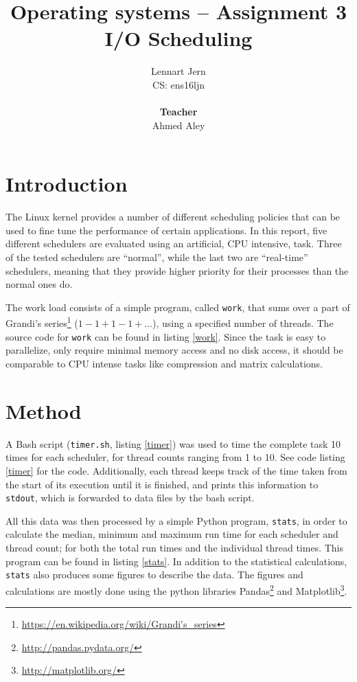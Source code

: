 \documentclass[12pt, a4paper]{article} %
\title{Operating systems -- Assignment 3\\I/O Scheduling}
\author{Lennart Jern\\
	CS: ens16ljn\\ \\ \textbf{Teacher}\\ Ahmed Aley}
\begin{document}
\maketitle

\newpage


\section{Introduction}

The Linux kernel provides a number of different scheduling policies that can be used to fine tune the performance of certain applications.
In this report, five different schedulers are evaluated using an artificial, CPU intensive, task.
Three of the tested schedulers are ``normal'', while the last two are ``real-time'' schedulers, meaning that they provide higher priority for their processes than the normal ones do.

The work load consists of a simple program, called \texttt{work}, that sums over a part of Grandi's series\footnote{\url{https://en.wikipedia.org/wiki/Grandi's_series}} ($1-1+1-1+\dots$), using a specified number of threads.
The source code for \texttt{work} can be found in listing \ref{work}.
Since the task is easy to parallelize, only require minimal memory access and no disk access, it should be comparable to CPU intense tasks like compression and matrix calculations.

\section{Method}

A Bash script (\texttt{timer.sh}, listing \ref{timer}) was used to time the complete task 10 times for each scheduler, for thread counts ranging from 1 to 10.
See code listing \ref{timer} for the code.
Additionally, each thread keeps track of the time taken from the start of its execution until it is finished, and prints this information to \texttt{stdout}, which is forwarded to data files by the bash script.

All this data was then processed by a simple Python program, \texttt{stats}, in order to calculate the median, minimum and maximum run time for each scheduler and thread count; for both the total run times and the individual thread times.
This program can be found in listing \ref{stats}.
In addition to the statistical calculations, \texttt{stats} also produces some figures to describe the data.
The figures and calculations are mostly done using the python libraries Pandas\footnote{\url{http://pandas.pydata.org/}} and Matplotlib\footnote{\url{http://matplotlib.org/}}.
\end{document}
